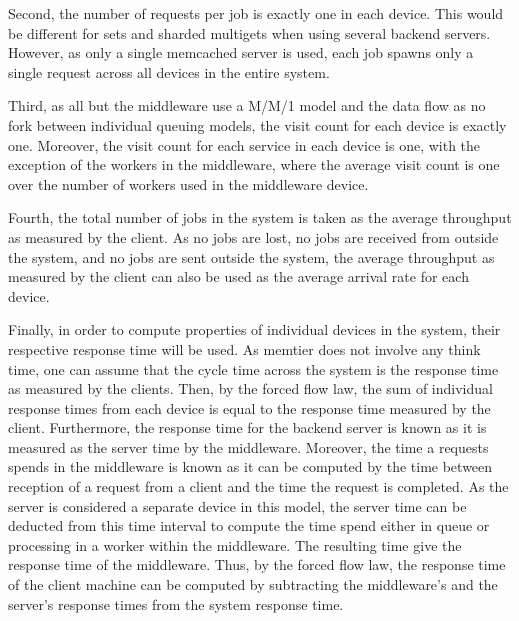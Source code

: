 \documentclass[11pt,a4paper]{article}
\begin{document}
Second, the number of requests per job is exactly one in each device. This would be different for sets and sharded multigets when using several backend servers. However, as only a single memcached server is used, each job spawns only a single request across all devices in the entire system.

Third, as all but the middleware use a M/M/1 model and the data flow as no fork between individual queuing models, the visit count for each device is exactly one. Moreover, the visit count for each service in each device is one, with the exception of the workers in the middleware, where the average visit count is one over the number of workers used in the middleware device.

Fourth, the total number of jobs in the system is taken as the average throughput as measured by the client. As no jobs are lost, no jobs are received from outside the system, and no jobs are sent outside the system, the average throughput as measured by the client can also be used as the average arrival rate for each device.

Finally, in order to compute properties of individual devices in the system, their respective response time will be used. As memtier does not involve any think time, one can assume that the cycle time across the system is the response time as measured by the clients. Then, by the forced flow law, the sum of individual response times from each device is equal to the response time measured by the client. Furthermore, the response time for the backend server is known as it is measured as the server time by the middleware. Moreover, the time a requests spends in the middleware is known as it can be computed by the time between reception of a request from a client and the time the request is completed. As the server is considered a separate device in this model, the server time can be deducted from this time interval to compute the time spend either in queue or processing in a worker within the middleware. The resulting time give the response time of the middleware. Thus, by the forced flow law, the response time of the client machine can be computed by subtracting the middleware's and the server's response times from the system response time.
\end{document}
